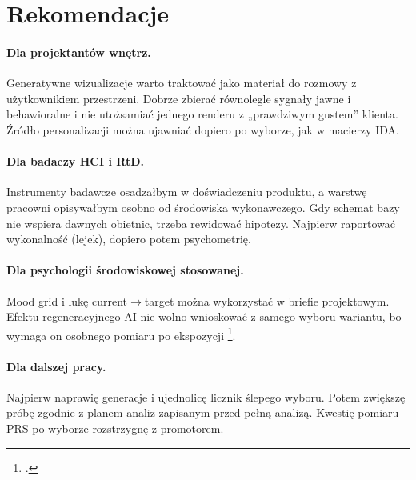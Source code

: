 \section{Rekomendacje}
\label{ch10:sec:rekomendacje}

\paragraph{Dla projektantów wnętrz.}
Generatywne wizualizacje warto traktować jako materiał do rozmowy z użytkownikiem przestrzeni. Dobrze zbierać równolegle sygnały jawne i behawioralne i nie utożsamiać jednego renderu z „prawdziwym gustem” klienta. Źródło personalizacji można ujawniać dopiero po wyborze, jak w macierzy IDA.

\paragraph{Dla badaczy HCI i RtD.}
Instrumenty badawcze osadzałbym w doświadczeniu produktu, a warstwę pracowni opisywałbym osobno od środowiska wykonawczego. Gdy schemat bazy nie wspiera dawnych obietnic, trzeba rewidować hipotezy. Najpierw raportować wykonalność (lejek), dopiero potem psychometrię.

\paragraph{Dla psychologii środowiskowej stosowanej.}
Mood grid i lukę current$\rightarrow$target można wykorzystać w briefie projektowym. Efektu regeneracyjnego AI nie wolno wnioskować z samego wyboru wariantu, bo wymaga on osobnego pomiaru po ekspozycji \footcite{kaplan1995restorative}.

\paragraph{Dla dalszej pracy.}
Najpierw naprawię generacje i ujednolicę licznik ślepego wyboru. Potem zwiększę próbę zgodnie z planem analiz zapisanym przed pełną analizą. Kwestię pomiaru PRS po wyborze rozstrzygnę z promotorem.
